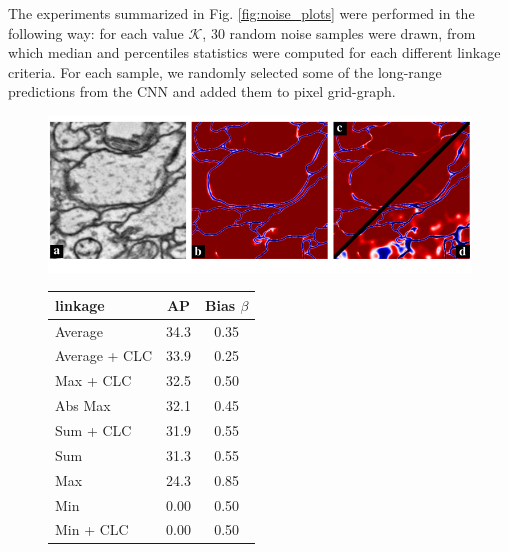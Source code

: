 The experiments summarized in Fig. \ref{fig:noise_plots} were performed in the following way: for each value $\mathcal{K}$, 30 random noise samples were drawn, from which median and percentiles statistics were computed for each different linkage criteria. For each sample, we randomly selected some of the long-range predictions from the CNN and added them to pixel grid-graph.
\begin{figure}[t]
\centering
\begin{minipage}[T]{0.6\textwidth}
\centering
        \includegraphics[width=\textwidth,trim=0.0in -0.in -0.0in -0.4in,clip]{figs/noisy_affs_comparison.pdf}
    \label{fig:noisy_affs}
\end{minipage}\hfill
\begin{minipage}[T]{0.35\textwidth}
    \centering
    \footnotesize
        \begin{tabular}{l|c|c}
          \algname{} linkage & AP  & Bias $\beta$ \\ \midrule
          Average & 34.3 & 0.35 \\
          Average + CLC & 33.9 & 0.25\\
          Max + CLC & 32.5 & 0.50 \\
          Abs Max & 32.1 & 0.45\\
          Sum + CLC & 31.9 & 0.55 \\
          Sum & 31.3 & 0.55 \\
          Max & 24.3 & 0.85 \\
          Min & 0.00 & 0.50 \\
          Min + CLC & 0.00 & 0.50 \\
        \end{tabular}
    \label{tab:extended_results_cityscapes_val}
\end{minipage}
\end{figure}



